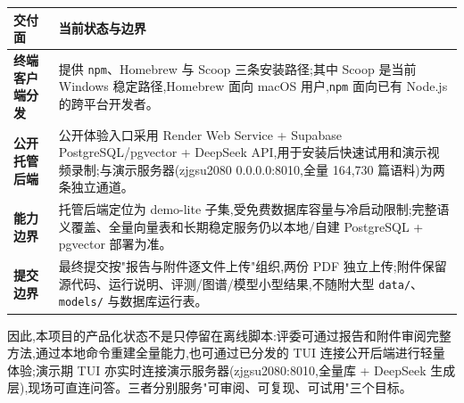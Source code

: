 \begin{tableblock}
\begin{tabularx}{0.96\textwidth}{>{\bfseries}p{30mm}X}
\toprule
\textbf{交付面} & \textbf{当前状态与边界} \\
\midrule
终端客户端分发 & 提供 \texttt{npm}、Homebrew 与 Scoop 三条安装路径;其中 Scoop 是当前 Windows 稳定路径,Homebrew 面向 macOS 用户,\texttt{npm} 面向已有 Node.js 的跨平台开发者。 \\
公开托管后端 & 公开体验入口采用 Render Web Service + Supabase PostgreSQL/pgvector + DeepSeek API,用于安装后快速试用和演示视频录制;与演示服务器(zjgsu2080 0.0.0.0:8010,全量 164{,}730 篇语料)为两条独立通道。 \\
能力边界 & 托管后端定位为 demo-lite 子集,受免费数据库容量与冷启动限制;完整语义覆盖、全量向量表和长期稳定服务仍以本地/自建 PostgreSQL + pgvector 部署为准。 \\
提交边界 & 最终提交按"报告与附件逐文件上传"组织,两份 PDF 独立上传;附件保留源代码、运行说明、评测/图谱/模型小型结果,不随附大型 \texttt{data/}、\texttt{models/} 与数据库运行表。 \\
\bottomrule
\end{tabularx}
\end{tableblock}

因此,本项目的产品化状态不是只停留在离线脚本:评委可通过报告和附件审阅完整方法,通过本地命令重建全量能力,也可通过已分发的 TUI 连接公开后端进行轻量体验;演示期 TUI 亦实时连接演示服务器(zjgsu2080:8010,全量库 + DeepSeek 生成层),现场可直连问答。三者分别服务"可审阅、可复现、可试用"三个目标。
